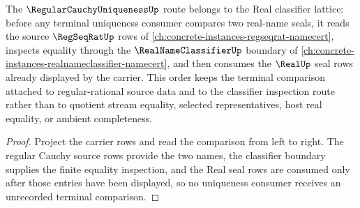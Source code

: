 The $\RegularCauchyUniquenessUp$ route belongs to the Real classifier lattice: before any terminal uniqueness consumer compares two real-name seals, it reads the source $\RegSeqRatUp$ rows of \autoref{ch:concrete-instances-regseqrat-namecert}, inspects equality through the $\RealNameClassifierUp$ boundary of \autoref{ch:concrete-instances-realnameclassifier-namecert}, and then consumes the $\RealUp$ seal rows already displayed by the carrier. This order keeps the terminal comparison attached to regular-rational source data and to the classifier inspection route rather than to quotient stream equality, selected representatives, host real equality, or ambient completeness.

\begin{proof}
Project the carrier rows and read the comparison from left to right. The regular Cauchy source rows provide the two names, the classifier boundary supplies the finite equality inspection, and the Real seal rows are consumed only after those entries have been displayed, so no uniqueness consumer receives an unrecorded terminal comparison.
\end{proof}
